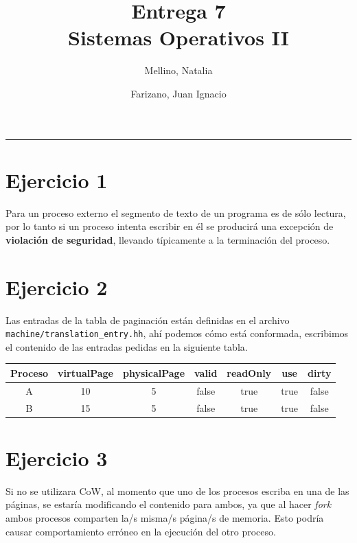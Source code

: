 \documentclass[11pt]{article}
\title{
    Entrega 7 \\
    \large Sistemas Operativos II}
\author{Mellino, Natalia \and Farizano, Juan Ignacio}
\date{}
\begin{document}
\maketitle

\noindent\rule{\textwidth}{1pt}

\section*{Ejercicio 1}

Para un proceso externo el segmento de texto de un programa es de sólo lectura,
por lo tanto si un proceso intenta escribir en él se producirá una excepción de
\textbf{violación de seguridad}, llevando típicamente a la terminación del proceso.

\section*{Ejercicio 2}

Las entradas de la tabla de paginación están definidas en el archivo
\texttt{machine/translation\_entry.hh}, ahí podemos cómo está conformada, 
escribimos el contenido de las entradas pedidas en la siguiente tabla.

\begin{table}[h!]
  \begin{center}
        \begin{tabular}{|c|c|c|c|c|c|c|}
            \hline
            Proceso & virtualPage & physicalPage & valid & readOnly & use  & dirty \\ \hline
            A       & 10          & 5            & false & true     & true & false \\ \hline
            B       & 15          & 5            & false & true     & true & false \\ \hline
        \end{tabular}
  \end{center}
\end{table}

\section*{Ejercicio 3}

Si no se utilizara CoW, al momento que uno de los procesos escriba en una de
las páginas, se estaría modificando el contenido para ambos, ya que al 
hacer \emph{fork} ambos procesos comparten la/s misma/s página/s de memoria. Esto
podría causar comportamiento erróneo en la ejecución del otro proceso.
\end{document}
